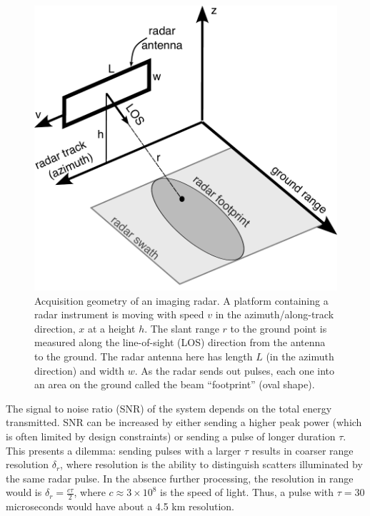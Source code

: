 \begin{figure}
	\centering
		\includegraphics[width=0.99\linewidth]{figures/chapter3-sar/ch3-sar-geometry.pdf}
	\caption[Acquisition geometry of an imaging radar]{Acquisition geometry of an  imaging radar. A platform containing a radar instrument is moving with speed $v$ in the azimuth/along-track direction, $x$ at a height $h$.
    The slant range $r$ to the ground point is measured along the line-of-sight (LOS) direction from the antenna to the ground.
   	The radar antenna here has length $L$ (in the azimuth direction) and width $w$.
   	As the radar sends out pulses, each one into an area on the ground called the beam ``footprint'' (oval shape). 
	}
	\label{fig:ch3-sar-geometry}
\end{figure}

%

The signal to noise ratio (SNR) of the system depends on the total energy transmitted.  SNR can be increased by either sending a higher peak power (which is often limited by design constraints) or sending a pulse of longer duration $\tau$. This presents a dilemma: sending pulses with a larger $\tau$ results in coarser range resolution $\delta_r$, where resolution is the ability to distinguish scatters illuminated by the same radar pulse. In the absence further processing, the resolution in range would is $\delta_r = \frac{c \tau}{2}$, where $c \approx 3 \times 10^8$ is the speed of light. Thus, a pulse with $\tau = 30 $ microseconds would have about a 4.5 km resolution.

